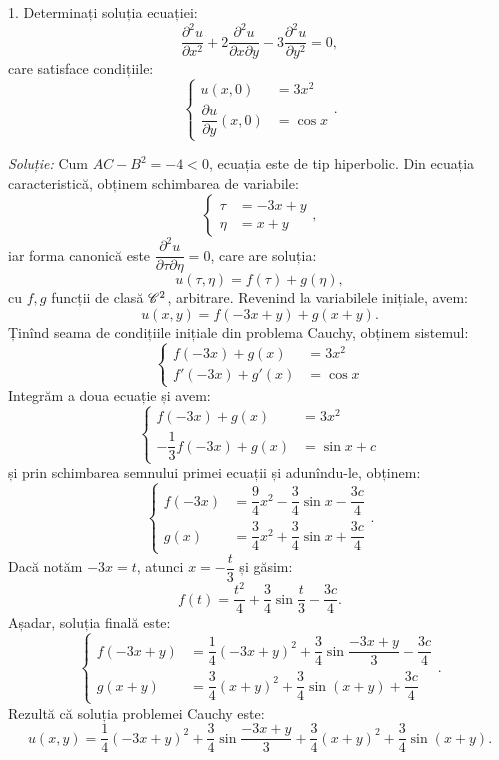 1. Determinați soluția ecuației:
\[
  \dfrac{\partial^2 u}{\partial x^2} + 2 \dfrac{\partial^2 u}{\partial x \partial y} - %
  3 \dfrac{\partial^2 u}{\partial y^2} = 0,
\]
care satisface condițiile:
\[
  \begin{cases}
    u(x, 0) &= 3x^2 \\
    \dfrac{\partial u}{\partial y}(x, 0) &= \cos x
  \end{cases}.
\]

\emph{Soluție:} Cum $ AC - B^2 = -4 < 0 $, ecuația este de tip hiperbolic.
Din ecuația caracteristică, obținem schimbarea de variabile:
\[
  \begin{cases}
    \tau &= -3x + y \\
    \eta &= x + y
  \end{cases},
\]
iar forma canonică este $ \dfrac{\partial^2 u}{\partial \tau\partial \eta} = 0 $,
care are soluția:
\[
  u(\tau, \eta) = f(\tau) + g(\eta),
\]
cu $ f, g $ funcții de clasă $ \mathscr{C}^2 $, arbitrare. Revenind la variabilele
inițiale, avem:
\[
  u(x, y) = f(-3x + y) + g(x + y).
\]
Ținînd seama de condițiile inițiale din problema Cauchy, obținem sistemul:
\[
  \begin{cases}
    f(-3x) + g(x) &= 3x^2 \\
    f'(-3x) + g'(x) &= \cos x
  \end{cases}
\]
Integrăm a doua ecuație și avem:
\[
  \begin{cases}
    f(-3x) + g(x) &= 3x^2 \\
    -\dfrac{1}{3}f(-3x) + g(x) &= \sin x + c
  \end{cases}
\]
și prin schimbarea semnului primei ecuații și adunîndu-le, obținem:
\[
  \begin{cases}
    f(-3x) &= \dfrac{9}{4} x^2 - \dfrac{3}{4} \sin x - \dfrac{3c}{4} \\
    g(x) &= \dfrac{3}{4} x^2 + \dfrac{3}{4} \sin x + \dfrac{3c}{4}
  \end{cases}.
\]
Dacă notăm $ -3x = t $, atunci $ x = -\dfrac{t}{3} $ și găsim:
\[
  f(t) = \dfrac{t^2}{4} + \dfrac{3}{4} \sin \dfrac{t}{3} - \dfrac{3c}{4}.
\]
Așadar, soluția finală este:
\[
  \begin{cases}
    f(-3x + y) &= \dfrac{1}{4}(-3x + y)^2 + \dfrac{3}{4} \sin \dfrac{-3x + y}{3} - \dfrac{3c}{4} \\
    g(x + y)   &= \dfrac{3}{4}(x + y)^2 + \dfrac{3}{4} \sin(x + y) + \dfrac{3c}{4}
  \end{cases}.
\]
Rezultă că soluția problemei Cauchy este:
\[
  u(x, y) = \dfrac{1}{4}(-3x + y)^2 + \dfrac{3}{4} \sin \dfrac{-3x + y}{3} + %
  \dfrac{3}{4}(x + y)^2 + \dfrac{3}{4} \sin(x + y).
\]


